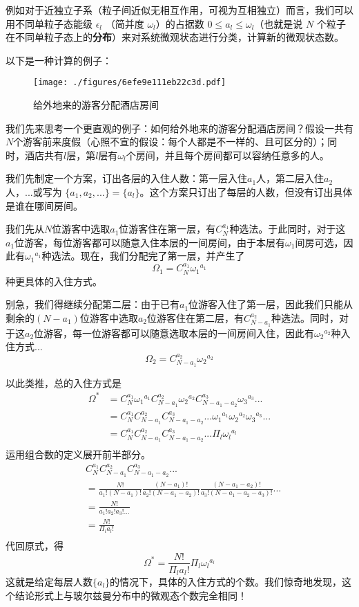 例如对于近独立子系（粒子间近似无相互作用，可视为互相独立）而言，我们可以用不同单粒子态能级 $\epsilon_l$ （简并度 $\omega_l$）的占据数 $0\le a_l\le \omega_l$（也就是说 $N$ 个粒子在不同单粒子态上的\textbf{分布}）来对系统微观状态进行分类，计算新的微观状态数。

以下是一种计算的例子：
\begin{example}{}
\begin{figure}[ht]
\centering
\texttt{[image: ./figures/6efe9e111eb22c3d.pdf]}
\caption{给外地来的游客分配酒店房间} \label{fig_entro2_1}
\end{figure}
我们先来思考一个更直观的例子：如何给外地来的游客分配酒店房间？假设一共有$N$个游客前来度假（心照不宣的假设：每个人都是不一样的、且可区分的）；同时，酒店共有$l$层，第$l$层有$\omega_l$个房间，并且每个房间都可以容纳任意多的人。

我们先制定一个方案，订出各层的入住人数：第一层入住$a_1$人，第二层入住$a_2$人，...或写为 $\{a_1,a_2,...\}=\{a_l\}$。这个方案只订出了每层的人数，但没有订出具体是谁在哪间房间。

我们先从$N$位游客中选取$a_1$位游客住在第一层，有$C_N^{a_1}$种选法。于此同时，对于这$a_1$位游客，每位游客都可以随意入住本层的一间房间，由于本层有$\omega_1$间房可选，因此有${\omega_1}^{a_1}$种选法。现在，我们分配完了第一层，并产生了$$\Omega_1 = C_N^{a_1} {\omega_1}^{a_1}$$种更具体的入住方式。

别急，我们得继续分配第二层：由于已有$a_1$位游客入住了第一层，因此我们只能从剩余的$(N-a_1)$位游客中选取$a_2$位游客住在第二层，有$C_{N-a_1}^{a_2}$种选法。同时，对于这$a_2$位游客，每一位游客都可以随意选取本层的一间房间入住，因此有${\omega_2}^{a_2}$种入住方式...
$$\Omega_2 = C_{N-a_1}^{a_2} {\omega_2}^{a_2}$$

以此类推，总的入住方式是
$$
\begin{aligned}
\Omega^* &= C_N^{a_1} {\omega_1}^{a_1} C_{N-a_1}^{a_2} {\omega_2}^{a_2} C_{N-a_1-a_2}^{a_3} {\omega_3}^{a_3}...\\
&=C_N^{a_1} C_{N-a_1}^{a_2} C_{N-a_1-a_2}^{a_3} ... {\omega_1}^{a_1}{\omega_2}^{a_2}  {\omega_3}^{a_3}...\\
& = C_N^{a_1} C_{N-a_1}^{a_2} C_{N-a_1-a_2}^{a_3} ... \Pi_l{\omega_l}^{a_l}\\
\end{aligned}
$$
运用组合数的定义展开前半部分。
$$
\begin{aligned}
& C_N^{a_1} C_{N-a_1}^{a_2} C_{N-a_1-a_2}^{a_3} ...\\
&= \frac{N!}{a_1!(N-a_1)!} 
\frac{(N-a_1)!}{a_2!(N-a_1-a_2)!}
\frac{(N-a_1-a_2)!}{a_3!(N-a_1-a_2-a_3)!}
...\\
&=\frac{N!}{a_1!a_2!a_3!...} \\
&=\frac{N!}{\Pi_l a_l!} \\
\end{aligned}
$$
代回原式，得
$$
\Omega^* = \frac{N!}{\Pi_l a_l!}  \Pi_l{\omega_l}^{a_l}
$$
这就是给定每层人数$\{a_l\}$的情况下，具体的入住方式的个数。我们惊奇地发现，这个结论形式上与玻尔兹曼分布中的微观态个数完全相同！


\end{example}
